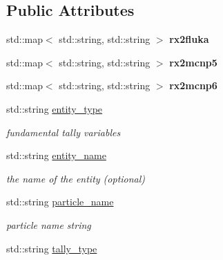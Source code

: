 \subsection*{Public Attributes}
\begin{DoxyCompactItemize}
\item 
std\+::map$<$ std\+::string, std\+::string $>$ {\bfseries rx2fluka}\hypertarget{classpyne_1_1_tally_a451b6a2d7a0de5e54936f2274861cc0d}{}\label{classpyne_1_1_tally_a451b6a2d7a0de5e54936f2274861cc0d}

\item 
std\+::map$<$ std\+::string, std\+::string $>$ {\bfseries rx2mcnp5}\hypertarget{classpyne_1_1_tally_ae402f5aca5baea59ffc51f68e12e0d30}{}\label{classpyne_1_1_tally_ae402f5aca5baea59ffc51f68e12e0d30}

\item 
std\+::map$<$ std\+::string, std\+::string $>$ {\bfseries rx2mcnp6}\hypertarget{classpyne_1_1_tally_a6c2c0bad20d29a6b73110ae5610cd572}{}\label{classpyne_1_1_tally_a6c2c0bad20d29a6b73110ae5610cd572}

\item 
std\+::string \hyperlink{classpyne_1_1_tally_a8b2e517c759ca71bc7b25c4de5a412f9}{entity\+\_\+type}
\begin{DoxyCompactList}\small\item\em fundamental tally variables \end{DoxyCompactList}\item 
std\+::string \hyperlink{classpyne_1_1_tally_ac7892546a42be1385f0e805638a124b1}{entity\+\_\+name}\hypertarget{classpyne_1_1_tally_ac7892546a42be1385f0e805638a124b1}{}\label{classpyne_1_1_tally_ac7892546a42be1385f0e805638a124b1}

\begin{DoxyCompactList}\small\item\em the name of the entity (optional) \end{DoxyCompactList}\item 
std\+::string \hyperlink{classpyne_1_1_tally_af79d35607aeb81e366f76ab75e2bfda0}{particle\+\_\+name}\hypertarget{classpyne_1_1_tally_af79d35607aeb81e366f76ab75e2bfda0}{}\label{classpyne_1_1_tally_af79d35607aeb81e366f76ab75e2bfda0}

\begin{DoxyCompactList}\small\item\em particle name string \end{DoxyCompactList}\item 
std\+::string \hyperlink{classpyne_1_1_tally_ae5944106656a49e0f7f525e75acaa4b2}{tally\+\_\+type}\hypertarget{classpyne_1_1_tally_ae5944106656a49e0f7f525e75acaa4b2}{}\label{classpyne_1_1_tally_ae5944106656a49e0f7f525e75acaa4b2}


\end{DoxyCompactItemize}
